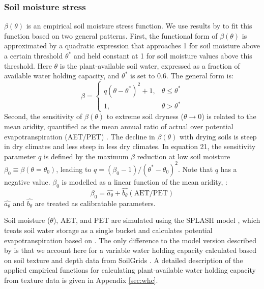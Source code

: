 \documentclass[gmd, manuscript]{copernicus}
\begin{document}
\subsubsection{Soil moisture stress}
\label{sec:soilmstress}
$\beta(\theta)$ is an empirical soil moisture stress function. We use results by \citet{stocker18newphyt} to fit this function based on two general patterns. First, the functional form of $\beta(\theta)$ is approximated by a quadratic expression that approaches 1 for soil moisture above a certain threshold $\theta^{\ast}$ and held constant at 1 for soil moisture values above this threshold. Here $\theta$ is the plant-available soil water, expressed as a fraction of available water holding capacity, and $\theta^{\ast}$ is set to 0.6. The general form is:
\begin{equation}
\label{eq:soilmstress}
    \beta =
\begin{cases}
    q(\theta - \theta^{\ast})^2 + 1,& \theta \leq \theta^{\ast}\\
    1,              & \theta > \theta^{\ast}
\end{cases}
\end{equation}
Second, the sensitivity of $\beta(\theta)$ to extreme soil dryness ($\theta \rightarrow 0$) is related to the mean aridity, quantified as the mean annual ratio of actual over potential evapotranspiration (AET/PET) \citep{stocker18newphyt}. The decline in $\beta(\theta)$ with drying soils is steep in dry climates and less steep in less dry climates. In equation 21, the sensitivity parameter $q$ is defined by the maximum $\beta$ reduction at low soil moisture $\beta_0\equiv\beta(\theta=\theta_0)$, leading to $q=(\beta_0-1)/(\theta^{\ast}-\theta_0)^2$. Note that $q$ has a negative value. $\beta_0$ is modelled as a linear function of the mean aridity, :
\begin{equation}
\label{eq:soilmsensitivity}
\beta_0 = \widehat{a_{\theta}} + \widehat{b_{\theta}} (\text{AET}/\text{PET})
\end{equation}
$\widehat{a_{\theta}}$ and $\widehat{b_{\theta}}$ are treated as calibratable parameters. 

Soil moisture ($\theta$), AET, and PET are simulated using the SPLASH model \citep{davis17}, which treats soil water storage as a single bucket and calculates potential evapotranspiration based on \citet{priestleytaylor72}. The only difference to the model version described by \citep{davis17} is that we account here for a variable water holding capacity calculated based on soil texture and depth data from SoilGrids \citep{Hengl2014-jm}. A detailed description of the applied empirical functions for calculating plant-available water holding capacity from texture data is given in Appendix \ref{sec:whc}.
\end{document}
